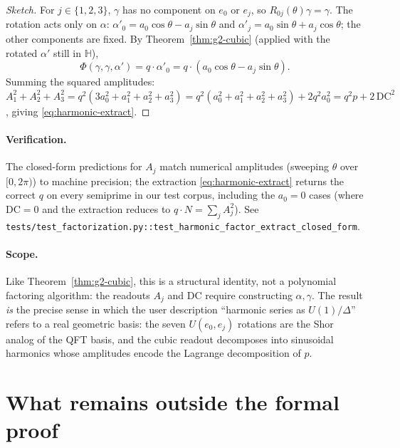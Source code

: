\documentclass[11pt,a4paper]{article}
\theoremstyle{plain}
\theoremstyle{definition}
\theoremstyle{remark}
\begin{document}
\begin{proof}[Sketch]
For $j \in \{1, 2, 3\}$, $\gamma$ has no component on $e_0$ or $e_j$, so
$R_{0j}(\theta)\gamma = \gamma$. The rotation acts only on $\alpha$:
$\alpha'_0 = a_0 \cos\theta - a_j \sin\theta$ and $\alpha'_j = a_0 \sin\theta + a_j \cos\theta$;
the other components are fixed. By Theorem~\ref{thm:g2-cubic} (applied with
the rotated $\alpha'$ still in $\mathbb{H}$),
\[
\Phi(\gamma, \gamma, \alpha') = q \cdot \alpha'_0 = q \cdot (a_0 \cos\theta - a_j \sin\theta).
\]
Summing the squared amplitudes:
$A_1^2 + A_2^2 + A_3^2 = q^2(3 a_0^2 + a_1^2 + a_2^2 + a_3^2) = q^2(a_0^2 + a_1^2 + a_2^2 + a_3^2) + 2 q^2 a_0^2 = q^2 p + 2\,\mathrm{DC}^2$, giving \eqref{eq:harmonic-extract}.
\end{proof}

\paragraph{Verification.} The closed-form predictions for $A_j$ match numerical
amplitudes (sweeping $\theta$ over $[0, 2\pi)$) to machine precision; the
extraction \eqref{eq:harmonic-extract} returns the correct $q$ on every
semiprime in our test corpus, including the $a_0 = 0$ cases (where $\mathrm{DC} = 0$
and the extraction reduces to $q \cdot N = \sum_j A_j^2$). See
\texttt{tests/test\_factorization.py::test\_harmonic\_factor\_extract\_closed\_form}.

\paragraph{Scope.}
Like Theorem~\ref{thm:g2-cubic}, this is a structural identity, not a polynomial
factoring algorithm: the readouts $A_j$ and $\mathrm{DC}$ require constructing
$\alpha, \gamma$. The result \emph{is} the precise sense in which the user
description ``harmonic series as $U(1)/\Delta$'' refers to a real geometric
basis: the seven $U(e_0, e_j)$ rotations are the Shor analog of the QFT basis,
and the cubic readout decomposes into sinusoidal harmonics whose amplitudes
encode the Lagrange decomposition of $p$.

\section{What remains outside the formal proof}
\end{document}
